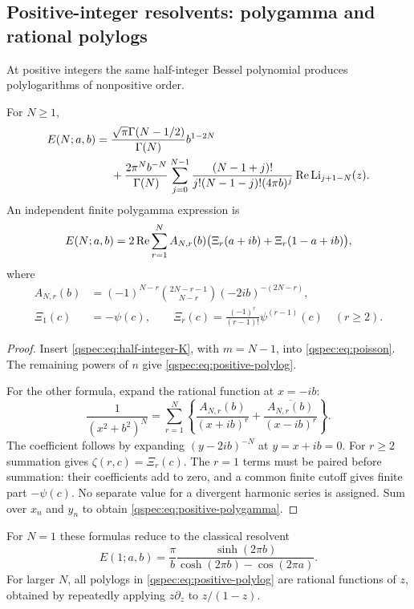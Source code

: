 \subsection{Positive-integer resolvents: polygamma and rational polylogs}
At positive integers the same half-integer Bessel polynomial produces
polylogarithms of nonpositive order.

\begin{proposition}\label{qspec:prop:positive}
For $N\ge1$,
\begin{align}
E(N;a,b)={}&\frac{\sqrt\pi\Gamma(N-1/2)}{\Gamma(N)}b^{1-2N}\notag\\
&+\frac{2\pi^N b^{-N}}{\Gamma(N)}
\sum_{j=0}^{N-1}\frac{(N-1+j)!}
 {j!(N-1-j)!(4\pi b)^j}\operatorname{Re}\operatorname{Li}_{j+1-N}(z).
\label{qspec:eq:positive-polylog}
\end{align}
An independent finite polygamma expression is
\begin{equation}\label{qspec:eq:positive-polygamma}
E(N;a,b)=2\operatorname{Re}\sum_{r=1}^N A_{N,r}(b)
\bigl(\Xi_r(a+ib)+\Xi_r(1-a+ib)\bigr),
\end{equation}
where
\begin{align}
A_{N,r}(b)&=(-1)^{N-r}\binom{2N-r-1}{N-r}(-2ib)^{-(2N-r)},\label{qspec:eq:Ar}\\
\Xi_1(c)&=-\psi(c),\qquad
\Xi_r(c)=\frac{(-1)^r}{(r-1)!}\psi^{(r-1)}(c)\quad(r\ge2).
\label{qspec:eq:Xi}
\end{align}
\end{proposition}
\begin{proof}
Insert \eqref{qspec:eq:half-integer-K}, with $m=N-1$, into
\eqref{qspec:eq:poisson}. The remaining powers of $n$ give
\eqref{qspec:eq:positive-polylog}.

For the other formula, expand the rational function at $x=-ib$:
\[
\frac1{(x^2+b^2)^N}
=\sum_{r=1}^N\left\{\frac{A_{N,r}(b)}{(x+ib)^r}
+\frac{\overline{A_{N,r}(b)}}{(x-ib)^r}\right\}.
\]
The coefficient follows by expanding $(y-2ib)^{-N}$ at $y=x+ib=0$.
For $r\ge2$ summation gives $\zeta(r,c)=\Xi_r(c)$. The $r=1$
terms must be paired before summation: their coefficients add to zero,
and a common finite cutoff gives finite part $-\psi(c)$. No separate
value for a divergent harmonic series is assigned. Sum over $x_n$
and $y_n$ to obtain \eqref{qspec:eq:positive-polygamma}.
\end{proof}
For $N=1$ these formulas reduce to the classical resolvent
\begin{equation}\label{qspec:eq:resolvent}
E(1;a,b)=\frac\pi b
\frac{\sinh(2\pi b)}{\cosh(2\pi b)-\cos(2\pi a)}.
\end{equation}
For larger $N$, all polylogs in
\eqref{qspec:eq:positive-polylog} are rational functions of $z$, obtained
by repeatedly applying $z\partial_z$ to $z/(1-z)$.

